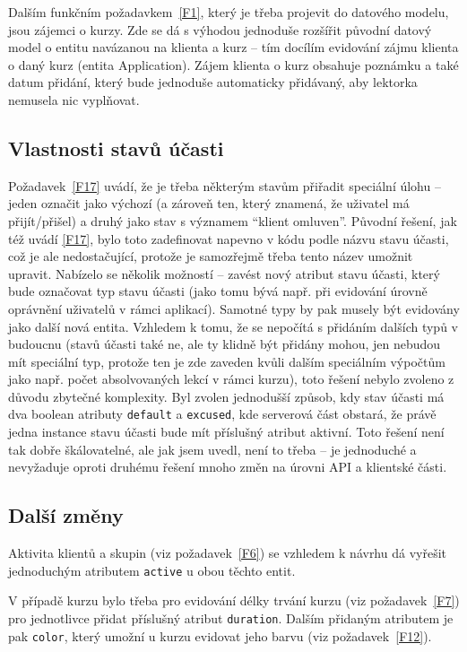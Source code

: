 Dalším funkčním požadavkem~\ref{F1}, který je třeba projevit do datového modelu, jsou zájemci o kurzy. Zde se dá s výhodou jednoduše rozšířit původní datový model o entitu navázanou na klienta a kurz -- tím docílím evidování zájmu klienta o daný kurz (entita Application). Zájem klienta o kurz obsahuje poznámku a také datum přidání, který bude jednoduše automaticky přidávaný, aby lektorka nemusela nic vyplňovat.

\subsection{Vlastnosti stavů účasti}

Požadavek~\ref{F17} uvádí, že je třeba některým stavům přiřadit speciální úlohu -- jeden označit jako výchozí (a zároveň ten, který znamená, že uživatel má přijít/přišel) a druhý jako stav s významem \enquote{klient omluven}. Původní řešení, jak též uvádí \ref{F17}, bylo toto zadefinovat napevno v kódu podle názvu stavu účasti, což je ale nedostačující, protože je samozřejmě třeba tento název umožnit upravit. Nabízelo se několik možností -- zavést nový atribut stavu účasti, který bude označovat typ stavu účasti (jako tomu bývá např. při evidování úrovně oprávnění uživatelů v rámci aplikací). Samotné typy by pak musely být evidovány jako další nová entita. Vzhledem k tomu, že se nepočítá s přidáním dalších typů v budoucnu (stavů účasti také ne, ale ty klidně být přidány mohou, jen nebudou mít speciální typ, protože ten je zde zaveden kvůli dalším speciálním výpočtům jako např. počet absolvovaných lekcí v rámci kurzu), toto řešení nebylo zvoleno z důvodu zbytečné komplexity. Byl zvolen jednodušší způsob, kdy stav účasti má dva boolean atributy \verb|default| a \verb|excused|, kde serverová část obstará, že právě jedna instance stavu účasti bude mít příslušný atribut aktivní. Toto řešení není tak dobře škálovatelné, ale jak jsem uvedl, není to třeba -- je jednoduché a nevyžaduje oproti druhému řešení mnoho změn na úrovni API a klientské části.

\subsection{Další změny}

Aktivita klientů a skupin (viz požadavek~\ref{F6}) se vzhledem k návrhu dá vyřešit jednoduchým atributem \verb|active| u obou těchto entit.

V případě kurzu bylo třeba pro evidování délky trvání kurzu (viz požadavek~\ref{F7}) pro jednotlivce přidat příslušný atribut \verb|duration|. Dalším přidaným atributem je pak \verb|color|, který umožní u kurzu evidovat jeho barvu (viz požadavek~\ref{F12}).

